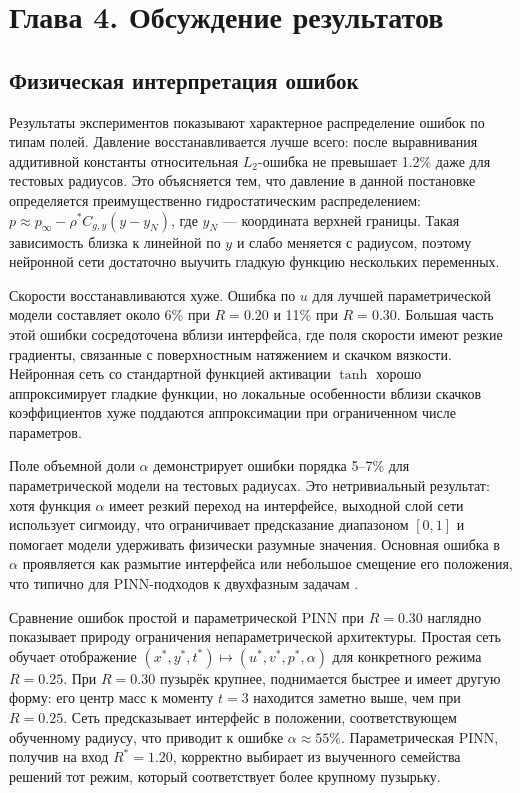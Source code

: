 \documentclass[12pt,a4paper]{article}
\begin{document}
\section{Глава 4. Обсуждение результатов}

\subsection{Физическая интерпретация ошибок}

Результаты экспериментов показывают характерное распределение ошибок по типам
полей. Давление восстанавливается лучше всего: после выравнивания аддитивной
константы относительная \(L_2\)-ошибка не превышает 1.2\% даже для тестовых
радиусов. Это объясняется тем, что давление в данной постановке определяется
преимущественно гидростатическим распределением: \(p \approx p_\infty - \rho^*
C_{g,y}(y - y_N)\), где \(y_N\) --- координата верхней границы. Такая зависимость
близка к линейной по \(y\) и слабо меняется с радиусом, поэтому нейронной сети
достаточно выучить гладкую функцию нескольких переменных.

Скорости восстанавливаются хуже. Ошибка по \(u\) для лучшей параметрической
модели составляет около 6\% при \(R=0.20\) и 11\% при \(R=0.30\). Большая часть
этой ошибки сосредоточена вблизи интерфейса, где поля скорости имеют резкие
градиенты, связанные с поверхностным натяжением и скачком вязкости. Нейронная
сеть со стандартной функцией активации \(\tanh\) хорошо аппроксимирует гладкие
функции, но локальные особенности вблизи скачков коэффициентов хуже поддаются
аппроксимации при ограниченном числе параметров.

Поле объемной доли \(\alpha\) демонстрирует ошибки порядка 5--7\% для
параметрической модели на тестовых радиусах. Это нетривиальный результат: хотя
функция \(\alpha\) имеет резкий переход на интерфейсе, выходной слой сети
использует сигмоиду, что ограничивает предсказание диапазоном \([0,1]\) и
помогает модели удерживать физически разумные значения. Основная ошибка в
\(\alpha\) проявляется как размытие интерфейса или небольшое смещение его
положения, что типично для PINN-подходов к двухфазным задачам
\cite{Buhendwa2021}.

Сравнение ошибок простой и параметрической PINN при \(R=0.30\) наглядно
показывает природу ограничения непараметрической архитектуры. Простая сеть
обучает отображение \((x^*,y^*,t^*)\mapsto(u^*,v^*,p^*,\alpha)\) для конкретного
режима \(R=0.25\). При \(R=0.30\) пузырёк крупнее, поднимается быстрее и имеет
другую форму: его центр масс к моменту \(t=3\) находится заметно выше, чем при
\(R=0.25\). Сеть предсказывает интерфейс в положении, соответствующем обученному
радиусу, что приводит к ошибке \(\alpha \approx 55\%\). Параметрическая PINN,
получив на вход \(R^*=1.20\), корректно выбирает из выученного семейства решений
тот режим, который соответствует более крупному пузырьку.
\end{document}
